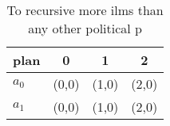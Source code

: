 \documentclass[a4paper]{article}
\begin{document}
\begin{table}
\begin{adjustbox}{width=0.6\columnwidth}
\begin{tabular}{|l|l|l|l|}
\hline
\textbf{plan} & \multicolumn{1}{c|}{\textbf{0}} & \multicolumn{1}{c|}{\textbf{1}} & \multicolumn{1}{c|}{\textbf{2}} \\ \hline
\textbf{$a_0$}  & (0,0) & (1,0) & (2,0) \\ \hline
\textbf{$a_1$}  & (0,0) & (1,0) & (2,0) \\ \hline
\end{tabular}
\end{adjustbox}
\caption{To recursive more ilms than any other political p
}
\end{table}
\end{document}
